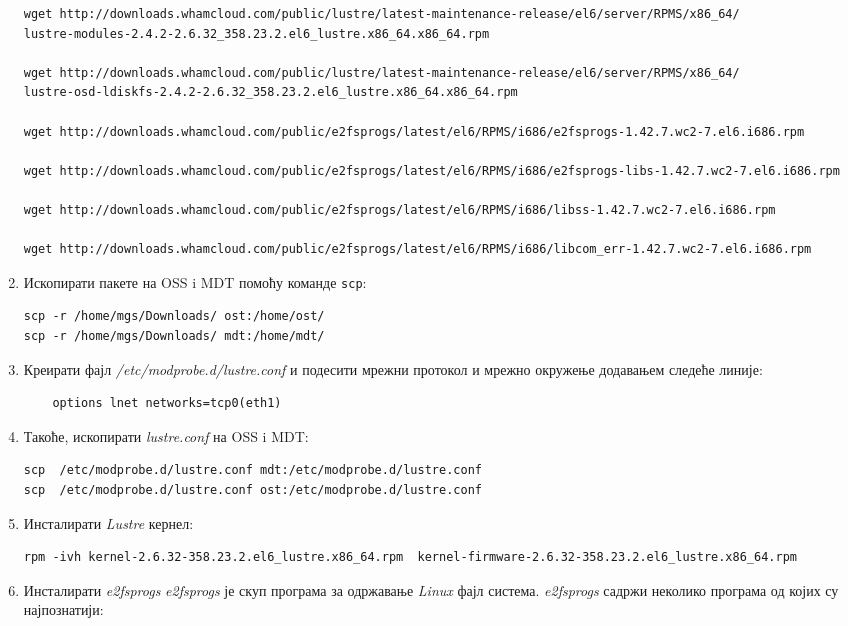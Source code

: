 \begin{enumerate}
\begin{lstlisting}[style=nonumbers,frame=single, caption= \textit{Lustre} пакетi]
wget http://downloads.whamcloud.com/public/lustre/latest-maintenance-release/el6/server/RPMS/x86_64/
lustre-modules-2.4.2-2.6.32_358.23.2.el6_lustre.x86_64.x86_64.rpm

wget http://downloads.whamcloud.com/public/lustre/latest-maintenance-release/el6/server/RPMS/x86_64/
lustre-osd-ldiskfs-2.4.2-2.6.32_358.23.2.el6_lustre.x86_64.x86_64.rpm

wget http://downloads.whamcloud.com/public/e2fsprogs/latest/el6/RPMS/i686/e2fsprogs-1.42.7.wc2-7.el6.i686.rpm

wget http://downloads.whamcloud.com/public/e2fsprogs/latest/el6/RPMS/i686/e2fsprogs-libs-1.42.7.wc2-7.el6.i686.rpm

wget http://downloads.whamcloud.com/public/e2fsprogs/latest/el6/RPMS/i686/libss-1.42.7.wc2-7.el6.i686.rpm

wget http://downloads.whamcloud.com/public/e2fsprogs/latest/el6/RPMS/i686/libcom_err-1.42.7.wc2-7.el6.i686.rpm
\end{lstlisting}

\item Ископирати пакете на OSS i MDT помоћу команде \texttt{scp}:
\begin{verbatim}
scp -r /home/mgs/Downloads/ ost:/home/ost/
scp -r /home/mgs/Downloads/ mdt:/home/mdt/
\end{verbatim}

\item Креирати фајл \textit{/etc/modprobe.d/lustre.conf} и подесити мрежни протокол и мрежно окружење додавањем следеће линије:
\begin{verbatim}
	options lnet networks=tcp0(eth1)
\end{verbatim}

\item Такоће, ископирати \textit{lustre.conf} на OSS i MDT:
\begin{verbatim}
scp  /etc/modprobe.d/lustre.conf mdt:/etc/modprobe.d/lustre.conf
scp  /etc/modprobe.d/lustre.conf ost:/etc/modprobe.d/lustre.conf
\end{verbatim}

\item Инсталирати \textit{Lustre} кернел:
\begin{lstlisting}[style=nonumbers,frame=single, caption=Инсталација \textit{Lustre} кернела]
rpm -ivh kernel-2.6.32-358.23.2.el6_lustre.x86_64.rpm  kernel-firmware-2.6.32-358.23.2.el6_lustre.x86_64.rpm 
\end{lstlisting}
\item Инсталирати \textit{e2fsprogs} 
\textit{e2fsprogs} је скуп програма за одржавање \textit{Linux} фајл система. \textit{e2fsprogs} садржи неколико програма од којих су најпознатији:


\end{enumerate}

